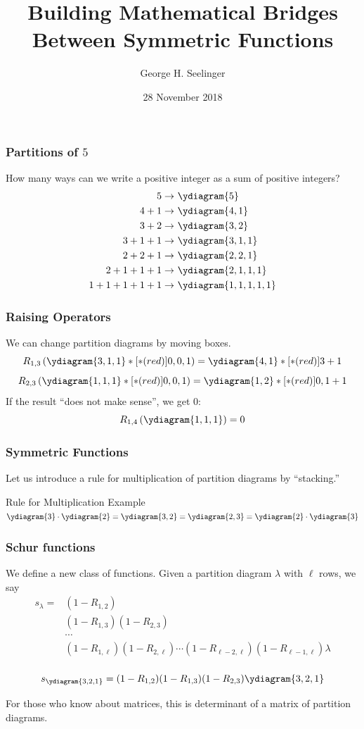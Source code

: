 \documentclass{beamer}
\title[Symmetric Functions]{Building Mathematical Bridges Between
  Symmetric Functions} %
\author[George H. Seelinger]{George H. Seelinger} %
\institute[JSF] %
{
Jefferson Scholars Foundation \\ %
\medskip
\textit{ghs9ae@virginia.edu} %
}
\date{28 November 2018} %
\begin{document}
\begin{frame}
\titlepage %
\end{frame}
\begin{frame}
  \frametitle{Partitions of \(5\)}
  How many ways can we write a positive integer as a sum of positive
  integers? \pause
    \begin{align*}
    5 \to &\ \ydiagram{5}\\
    4+1 \to &\ \ydiagram{4,1}\\
    3+2 \to &\ \ydiagram{3,2}\\
    3+1+1 \to &\ \ydiagram{3,1,1}\\
    2+2+1 \to&\ \ydiagram{2,2,1}\\
    2+1+1+1 \to&\ \ydiagram{2,1,1,1} \\
    1+1+1+1+1 \to&\ \ydiagram{1,1,1,1,1}
\end{align*}
\end{frame}
\begin{frame}
  \frametitle{Raising Operators}
  We can change partition diagrams by moving boxes.
  \[
    R_{1,3} \left( \ydiagram{3,1,1}*[*(red)]{0,0,1} \right) = \ydiagram{4,1}*[*(red)]{3+1}
  \]
\[
  R_{2,3} \left( \ydiagram{1,1,1}*[*(red)]{0,0,1} \right) = \ydiagram{1,2}*[*(red)]{0,1+1}
\]
\pause
If the result ``does not make sense'', we get \(0\): \[
  R_{1,4}\left( \ydiagram{1,1,1} \right) = 0
\]
\end{frame}
\begin{frame}
  \frametitle{Symmetric Functions}
  Let us introduce a rule for multiplication of partition diagrams by ``stacking.''
\begin{block}{Rule for Multiplication Example}
  \(
  \ydiagram{3} \cdot \ydiagram{2} = \ydiagram{3,2} =
  \ydiagram{2,3} = \ydiagram{2} \cdot \ydiagram{3}
  \)
\end{block}
\end{frame}
\begin{frame}
  \frametitle{Schur functions}
  We define a new class of functions. Given a partition diagram
  \(\lambda\) with 
  \(\ell\) rows, we say
  \begin{align*}
    s_\lambda = &(1-R_{1,2})\\
    &(1-R_{1,3})(1-R_{2,3})\\
    & \cdots\\
    &(1-R_{1,
      \ell})(1-R_{2,\ell})\cdots(1-R_{\ell-2,\ell})(1-R_{\ell-1,\ell})
    \lambda\\
  \end{align*}
  \begin{example}
    \[
      s_{\ydiagram{3,2,1}} = (1-R_{1,2})(1-R_{1,3})(1-R_{2,3})
      \ydiagram{3,2,1}
    \]
  \end{example}
    \pause For those who know about matrices, this is determinant of a matrix
    of partition diagrams.
\end{frame}
\end{document}

